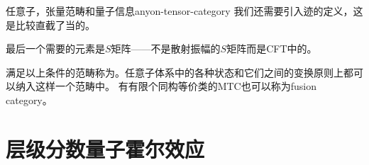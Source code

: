 \begin{back}{任意子，张量范畴和量子信息}{anyon-tensor-category}
    我们还需要引入迹的定义，这是比较直截了当的。

    最后一个需要的元素是$S$矩阵——不是散射振幅的$S$矩阵而是CFT中的。 %

    满足以上条件的范畴称为。任意子体系中的各种状态和它们之间的变换原则上都可以纳入这样一个范畴中。
    有有限个同构等价类的MTC也可以称为fusion category。
\end{back}

\section{层级分数量子霍尔效应}